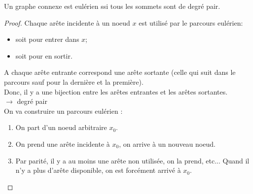\begin{mytheo} 
  Un graphe connexe est eulérien ssi tous les sommets sont de degré pair.
  \begin{proof}
    \noindent
    \newline
    \fbox{$\Longrightarrow$}
    \newline
    Chaque arête incidente à un noeud $x$ est utilisé par le parcours eulérien:
    \begin{itemize}
      \item soit pour entrer dans $x$;
      \item soit pour en sortir.\\
    \end{itemize}
    A chaque arête entrante correspond une arête sortante (celle qui suit dans le parcours sauf pour la dernière et la première).\\
    Donc, il y a une bijection entre les arêtes entrantes et les arêtes sortantes.\\
    $\longrightarrow$ degré pair \\

    \noindent
    \fbox{$\Longleftarrow$}
    \newline
    On va construire un parcours eulérien :\\
    \begin{enumerate}
      \item On part d'un noeud arbitraire $x_0$.
      \item On prend une arête incidente à $x_0$, on arrive à un nouveau noeud.
      \item Par parité, il y a au moins une arête non utilisée, on la prend, etc... Quand il n'y a plus d'arête disponible, on est forcément arrivé à $x_0$.\\
    \end{enumerate}
    \begin{center}
\end{center}
\end{proof}
\end{mytheo}
